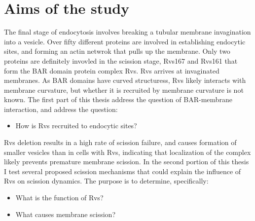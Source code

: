 
\chapter{Aims of the study} %

\label{Ch:Aims} %

The final stage of endocytosis involves breaking a tubular membrane invagination into a vesicle. Over fifty different proteins are involved in establishing endocytic sites, and forming an actin netwrok that pulls up the membrane. Only two proteins are  definitely invovled in the scission stage, Rvs167 and Rvs161 that form the  BAR domain protein complex Rvs. Rvs arrives at invaginated membranes. As BAR domains have curved structuress, Rvs likely interacts with membrane curvature, but whether it is recruited by membrane curvature is not known. The first part of this thesis address the question of BAR-membrane interaction, and address the question:


\begin{itemize}
	\item How is Rvs recruited to endocytic sites? 
\end{itemize}

Rvs deletion results in a high rate of scission failure, and causes formation of smaller vesicles than in cells with Rvs, indicating that localization of the complex likely prevents premature membrane scission. In the second portion of this thesis I test several proposed scission mechanisms that could explain the influence of Rvs on scission dynamics. The purpose is to determine, specifically: 

\begin{itemize}
	\item What is the function of Rvs?
	\item What causes membrane scission? 
\end{itemize}